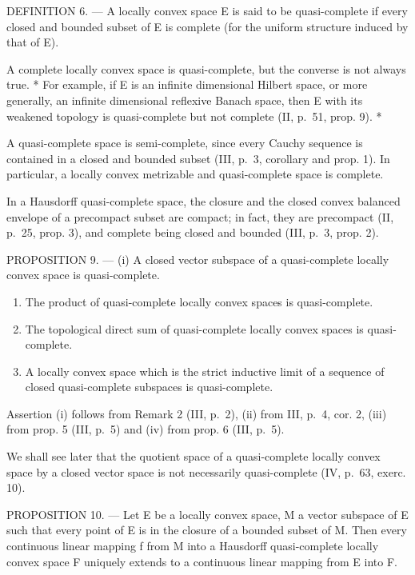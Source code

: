 DEFINITION 6. --- A locally convex space E is said to be quasi-complete if every closed and bounded subset of E is complete (for the uniform structure induced by that of E).

A complete locally convex space is quasi-complete, but the converse is not always true. * For example, if E is an infinite dimensional Hilbert space, or more generally, an infinite dimensional reflexive Banach space, then E with its weakened topology is quasi-complete but not complete (II, p.~51, prop. 9). *

A quasi-complete space is semi-complete, since every Cauchy sequence is contained in a closed and bounded subset (III, p.~3, corollary and prop. 1). In particular, a locally convex metrizable and quasi-complete space is complete.

In a Hausdorff quasi-complete space, the closure and the closed convex balanced envelope of a precompact subset are compact; in fact, they are precompact (II, p.~25, prop. 3), and complete being closed and bounded (III, p.~3, prop. 2).

PROPOSITION 9. --- (i) A closed vector subspace of a quasi-complete locally convex space is quasi-complete.

\begin{enumerate}
\def\labelenumi{(\roman{enumi})}
\setcounter{enumi}{1}
\item
  The product of quasi-complete locally convex spaces is quasi-complete.
\item
  The topological direct sum of quasi-complete locally convex spaces is quasi-complete.
\item
  A locally convex space which is the strict inductive limit of a sequence of closed quasi-complete subspaces is quasi-complete.
\end{enumerate}

Assertion (i) follows from Remark 2 (III, p.~2), (ii) from III, p.~4, cor. 2, (iii) from prop. 5 (III, p.~5) and (iv) from prop. 6 (III, p.~5).

We shall see later that the quotient space of a quasi-complete locally convex space by a closed vector space is not necessarily quasi-complete (IV, p.~63, exerc. 10).

PROPOSITION 10. --- Let E be a locally convex space, M a vector subspace of E such that every point of E is in the closure of a bounded subset of M. Then every continuous linear mapping f from M into a Hausdorff quasi-complete locally convex space F uniquely extends to a continuous linear mapping from E into F.

